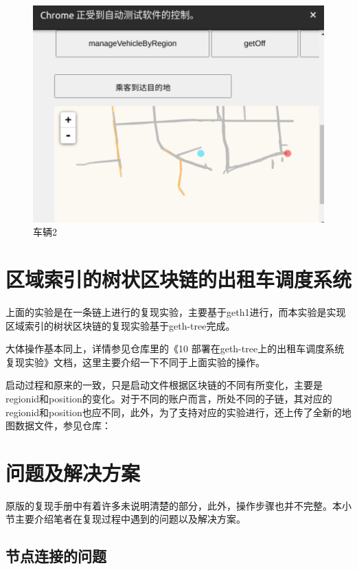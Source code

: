 \begin{figure}
	\centering
	\includegraphics[width=\textwidth]{figures/车辆2.png}
	\caption{车辆2}
	\label{fig:车辆2}
\end{figure}

\section{区域索引的树状区块链的出租车调度系统}

上面的实验是在一条链上进行的复现实验，主要基于geth1进行，而本实验是实现区域索引的树状区块链的复现实验基于geth-tree完成。
	
大体操作基本同上，详情参见仓库里的《10 部署在geth-tree上的出租车调度系统复现实验》文档，这里主要介绍一下不同于上面实验的操作。

启动过程和原来的一致，只是启动文件根据区块链的不同有所变化，主要是regionid和position的变化。对于不同的账户而言，所处不同的子链，其对应的regionid和position也应不同，此外，为了支持对应的实验进行，还上传了全新的地图数据文件，参见仓库：

\section{问题及解决方案}

原版的复现手册中有着许多未说明清楚的部分，此外，操作步骤也并不完整。本小节主要介绍笔者在复现过程中遇到的问题以及解决方案。

\subsection{节点连接的问题}

